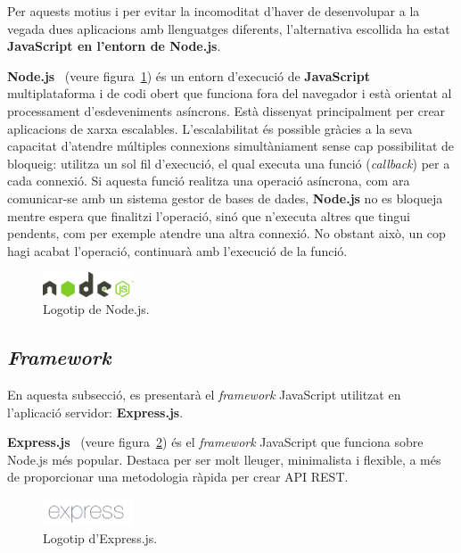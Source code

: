 \documentclass[a4paper,12pt]{ThesisStyle}
\begin{document}
Per aquests motius i per evitar la incomoditat d'haver de desenvolupar a la vegada dues aplicacions amb llenguatges diferents, l'alternativa escollida ha estat \textbf{JavaScript en l'entorn de Node.js}.

\textbf{Node.js}~\cite{Node} (veure figura~\ref{img:logo_node}) és un entorn d'execució de \textbf{JavaScript} multiplataforma i de codi obert que funciona fora del navegador i està orientat al processament d'esdeveniments asíncrons. Està dissenyat principalment per crear aplicacions de xarxa escalables. L'escalabilitat és possible gràcies a la seva capacitat d'atendre múltiples connexions simultàniament sense cap possibilitat de bloqueig: utilitza un sol fil d'execució, el qual executa una funció (\textit{callback}) per a cada connexió. Si aquesta funció realitza una operació asíncrona, com ara comunicar-se amb un sistema gestor de bases de dades, \textbf{Node.js} no es bloqueja mentre espera que finalitzi l'operació, sinó que n'executa altres que tingui pendents, com per exemple atendre una altra connexió. No obstant això, un cop hagi acabat l'operació, continuarà amb l'execució de la funció.

\begin{figure}[H]
  \centering
  \includegraphics[width=0.24\textwidth]{assets/logos/Node.png}
  \caption{\label{img:logo_node}Logotip de Node.js.}
\end{figure}

\subsection{\textit{Framework}}
\label{subsec:decisions_servidor_framework}

En aquesta subsecció, es presentarà el \textit{framework} JavaScript utilitzat en l'aplicació servidor: \textbf{Express.js}.

\textbf{Express.js}~\cite{Express} (veure figura~\ref{img:logo_express}) és el \textit{framework} JavaScript que funciona sobre Node.js més popular. Destaca per ser molt lleuger, minimalista i flexible, a més de proporcionar una metodologia ràpida per crear API REST.

\begin{figure}[H]
  \centering
  \includegraphics[width=0.24\textwidth]{assets/logos/Express.png}
  \caption{\label{img:logo_express}Logotip d'Express.js.}
\end{figure}
\end{document}
